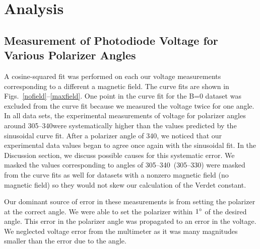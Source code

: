 \documentclass[prb,preprint]{revtex4-1}
\begin{document}
\section{Analysis}
{\subsection{Measurement of Photodiode Voltage for Various Polarizer Angles}
{A cosine-squared fit was performed on each our voltage measurements corresponding to a different a magnetic field. The curve fits are shown in Figs.~\ref{nofield}--\ref{maxfield}.  One point in the curve fit for the B=0 dataset was excluded from the curve fit because we measured the voltage twice for one angle. In all data sets, the experimental measurements of voltage for polarizer angles around 305\degree--340\degree were systematically higher than the values predicted by the sinusoidal curve fit. After a polarizer angle of 340\degree, we noticed that our experimental data values began to agree once again with the sinusoidal fit.  In the Discussion section, we discuss possible causes for this systematic error. We masked the values corresponding to angles of 305\degree--340\degree\ (305\degree--330\degree) were masked from the curve fits as well for datasets with a nonzero magnetic field (no magnetic field) so they would not skew our calculation of the Verdet constant.

Our dominant source of error in these measurements is from setting the polarizer at the correct angle. We were able to set the polarizer within $1\degree$ of the desired angle. This error in the polarizer angle was propagated to an error in the voltage. We neglected voltage error from the multimeter as it was many magnitudes smaller than the error due to the angle.

}}
\end{document}
